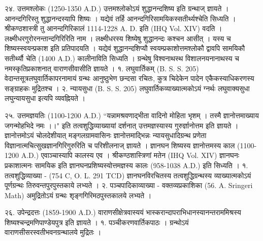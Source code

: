२४. उत्तमश्लोकः (1250-1350 A.D.)
उत्तमश्लोकोऽयं शुद्धानन्दशिष्य इति ग्रन्थाज् ज्ञायते । आनन्दगिरिस्तु शुद्धानन्दस्यापि शिष्यः । यद्येवं तर्हि आनन्दगिरिसामयिकस्सतीर्थ्यश्चेति सिध्यति । श्रीकण्ठशास्त्री तु आनन्दगिरिकालं 1114-1228 A. D. इति (IHQ Vol. XIV) वदति । लक्ष्मीधरगुरोरनन्तान्दगिरिरिति नाम । लक्ष्मीधरस्य शिष्येषु शुद्धानन्दः कश्चन आसीत् । यस्य च शिष्यस्स्वयन्प्रकाश इति प्रतिपादयति । यद्येवं शुद्धानन्दशिप्यौ स्वयम्प्रकाशोत्तमश्लोकौ द्वावपि सामयिकौ सतीर्थ्यौ चेति (1400 A.D.) कालीनाविति सिध्यति । ग्रन्थेषु विश्वनाथस्थ विशालनयनानाथस्य च नमस्कृतिप्रकाशनात् वाराणसीवासीति ज्ञायते ।
१. लघुवार्तिकम् (B. S. S. 205)
वेदान्तसूत्रलघुवार्तिकापरनामायं ग्रन्थः आनुष्ठुभेण छन्दसा रचितः, कुत्र चिदेकेन पादेन एकैकस्याधिकरणस्य सङ्ग्राहकः मुद्रितश्च ।
२. न्यायसुधा (B. S. S. 205)
लघुवार्तिकव्याख्यात्मकोऽयं ग्नर्थः लघुवाक्यसुधा लघुन्यायसुधा इत्यपि व्यवह्नियते ।

२५. उत्तमज्ञयतिः (1100-1200 A.D.)
``यन्नामश्रवणाद्भीता वादिनो मोहिता भृशम् ।
तस्मै ज्ञानोत्तमाख्याय जगन्मोहभिदे नमः ।।"
इति तत्वशुद्धिव्याख्यायां दर्शनात् उत्तमज्ञस्यास्य गुरुर्ज्ञानोत्तम इति ज्ञायते । ज्ञानोत्तमोऽयं चोलदेशीयात् मङ्गलग्रामवासिनः ज्ञानोत्तमाद्भिन्नः न्यायसुधादिग्रन्थ प्रणेता विज्ञानात्मचित्सुखज्ञानगिरिगुरुरिति च परिशीलनाज् ज्ञायते । ज्ञानघन शिष्यस्य ज्ञानोत्तमस्य काल (1100-1200 A.D.) एवाञ्चास्यापि कालस्य एव ।
श्रीकण्ठशास्त्रिणां मतेन (IHQ Vol. XIV) ज्ञानघनः प्रकाशात्मनः सामयिक इति ज्ञानघनप्रशिष्यस्योत्तमज्ञस्य कालः (958-1038 A.D.) इति सिध्यति ।
१. तत्वशुद्धिव्याख्या - (754 C, O. L. 291 TCD) ज्ञानघनविरचितस्य तत्वशुद्धिग्रन्थस्य व्याख्यात्मकोऽयं पूर्णग्रन्थः तिरुवन्तपुरपुस्तकाये लभ्यते ।
२. पञ्चपादिकाव्याख्या - वक्तव्यप्रकाशिका (56. A. Sringeri Math) अमुद्रितोऽयं ग्रन्थः शृङ्गगिरिमठपुस्तकालये लभ्यते ।

२६. उपेन्द्रदत्तः (1859-1900 A.D.)
वाराणसीक्षेत्रवास्ययं भास्करान्दापराभिधानस्यानन्तराममिश्रस्य शिष्यश्चन्द्रमणिपाण्डेयपुत्र इति ज्ञायते ।
१. पञ्चीकरणवार्तिकपाठः । ग्रन्थोऽयं वाराणसीसरस्वतीभवनग्रन्थालये मुद्रितः ।

